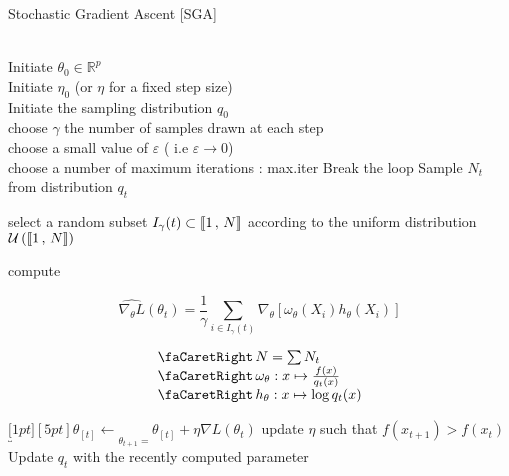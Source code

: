 	\begin{algorithm}[H]
		\caption{Stochastic Gradient Ascent [SGA]}\label{alg:sgaAdaptive}
		\begin{algorithmic}
			\Require
			\\ \ra Initiate $\theta_0 \in \mathbb R^p$
			\\ \ra Initiate $\eta_0$ (or $\eta$ for a fixed step size)
			\\ \ra Initiate the sampling distribution $q_0$
			\bigskip
			\\  choose $\gamma$ the number of samples drawn at each step
			\bigskip
			\\ \ra choose a small value of $\varepsilon$ ( i.e $\varepsilon \rightarrow 0 $)
			\\ \ra choose a number of maximum iterations : max.iter
			\State Break the loop
			\EndIf
			\State Sample $N_t$ from distribution $q_t$

			\bigskip

			\State {} select a random subset $I_\gamma(t) \subset \llbracket 1 \, , \, N \rrbracket$ according to the uniform distribution $\mathcal U \left( \llbracket 1 \, , \, N \rrbracket \right)$

			\bigskip

			\State {} compute

			$$\widehat{\nabla_\theta L}(\theta_t) = \frac 1 \gamma \displaystyle\sum\limits_{i \in I_\gamma(t)} \nabla_\theta \left[\omega_\theta(X_i) h_\theta(X_i)\right]$$


			$$\begin{array}{l}
					\faCaretRight \, {N = \sum N_t}
					\\
					\faCaretRight \, {\omega_\theta : x \mapsto \frac{f(x)}{q_t(x)}}
					\\
					\faCaretRight \, {h_\theta : x \mapsto \log q_t(x)}
				\end{array}
			$$

			\smallskip

			\State \ra $\underbracket[1pt][5pt]{\theta_{[t]} \gets}_{\theta_{t+1} = } \theta_{[t]} + \eta \nabla L(\theta_t)$
			\State \ra update $\eta$ such that $f(x_{t+1}) > f(x_t)$
			\State \ra Update $q_t$ with the recently computed parameter
			\EndFor
		\end{algorithmic}
	\end{algorithm}

